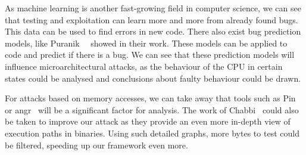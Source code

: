 As machine learning is another fast-growing field in computer science, we can
see that testing and exploitation can learn more and more from already found
bugs. This data can be used to find errors in new code. There also exist bug
prediction models, like Puranik~\etal~\cite{bugprediction} showed in their work.
These models can be applied to code and predict if there is a bug. We can see
that these prediction models will influence microarchitectural attacks, as the
behaviour of the CPU in certain states could be analysed and conclusions about
faulty behaviour could be drawn.


For attacks based on memory accesses, we can take away that tools such as
Pin~\cite{pintools} or angr~\cite{angr} will be a significant factor for
analysis. The work of Chabbi~\etal\cite{pincallpaths} could also be taken to
improve our attack as they provide an even more in-depth view of execution paths
in binaries. Using such detailed graphs, more bytes to test could be filtered,
speeding up our framework even more.

